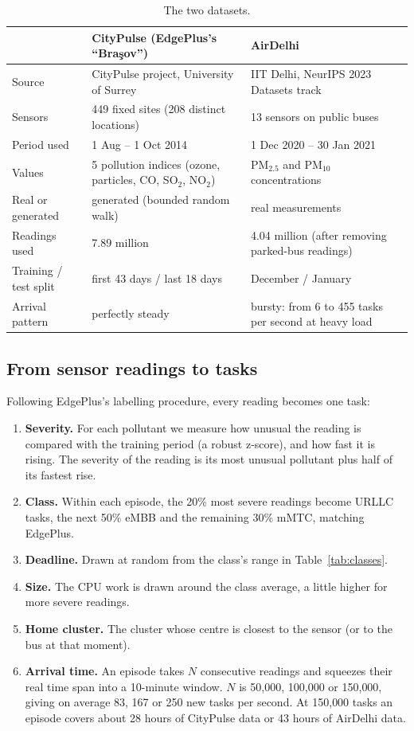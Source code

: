 \documentclass[11pt]{article}
\newcommand{\botrule}{\bottomrule}
\theoremstyle{definition}
\begin{document}
\begin{table}[!htbp]
\caption{The two datasets.}
\label{tab:datasets}
\small
\begin{tabularx}{\textwidth}{lLL}
\toprule
 & CityPulse (EdgePlus's ``Bra\c{s}ov'') & AirDelhi\\
\midrule
Source & CityPulse project, University of Surrey & IIT Delhi, NeurIPS 2023 Datasets track\\
Sensors & 449 fixed sites (208 distinct locations) & 13 sensors on public buses\\
Period used & 1 Aug -- 1 Oct 2014 & 1 Dec 2020 -- 30 Jan 2021\\
Values & 5 pollution indices (ozone, particles, CO, SO$_2$, NO$_2$) & PM$_{2.5}$ and PM$_{10}$ concentrations\\
Real or generated & generated (bounded random walk) & real measurements\\
Readings used & 7.89 million & 4.04 million (after removing parked-bus readings)\\
Training / test split & first 43 days / last 18 days & December / January\\
Arrival pattern & perfectly steady & bursty: from 6 to 455 tasks per second at heavy load\\
\botrule
\end{tabularx}
\end{table}

\subsection{From sensor readings to tasks}
Following EdgePlus's labelling procedure, every reading becomes one task:
\begin{enumerate}
\item \textbf{Severity.} For each pollutant we measure how unusual the reading is compared with the training
period (a robust z-score), and how fast it is rising. The severity of the reading is its most unusual pollutant
plus half of its fastest rise.
\item \textbf{Class.} Within each episode, the 20\% most severe readings become URLLC tasks, the next 50\% eMBB and
the remaining 30\% mMTC, matching EdgePlus.
\item \textbf{Deadline.} Drawn at random from the class's range in Table~\ref{tab:classes}.
\item \textbf{Size.} The CPU work is drawn around the class average, a little higher for more severe readings.
\item \textbf{Home cluster.} The cluster whose centre is closest to the sensor (or to the bus at that moment).
\item \textbf{Arrival time.} An episode takes $N$ consecutive readings and squeezes their real time span into a
10-minute window. $N$ is 50{,}000, 100{,}000 or 150{,}000, giving on average 83, 167 or 250 new tasks per second.
At 150{,}000 tasks an episode covers about 28 hours of CityPulse data or 43 hours of AirDelhi data.
\end{enumerate}
\end{document}
